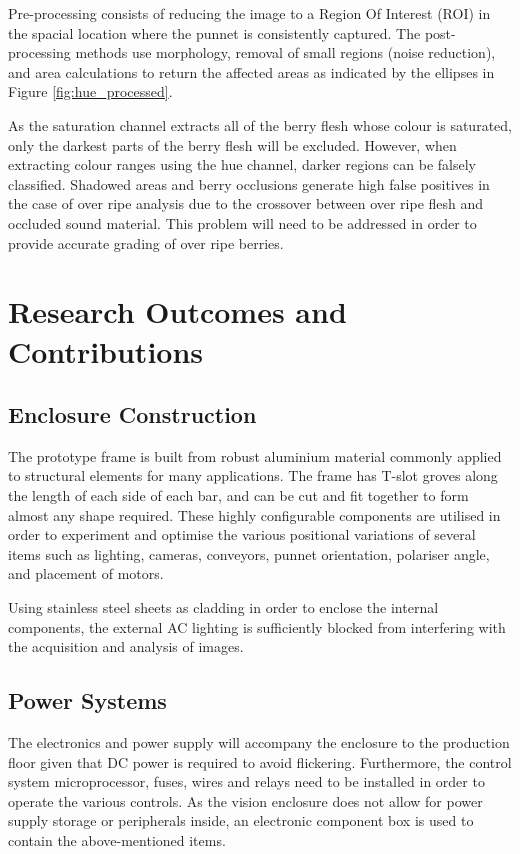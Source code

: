 \documentclass[fleqn,twoside,12pt]{report}
\begin{document}
Pre-processing consists of reducing the image to a Region Of Interest (ROI) in the spacial location where the punnet is consistently captured. The post-processing methods use morphology, removal of small regions (noise reduction), and area calculations to return the affected areas as indicated by the ellipses in Figure \ref{fig:hue_processed}.


As the saturation channel extracts all of the berry flesh whose colour is saturated, only the darkest parts of the berry flesh will be excluded. However, when extracting colour ranges using the hue channel, darker regions can be falsely classified. Shadowed areas and berry occlusions generate high false positives in the case of over ripe analysis due to the crossover between over ripe flesh and occluded sound material. This problem will need to be addressed in order to provide accurate grading of over ripe berries. 


\section{Research Outcomes and Contributions}


\subsection{Enclosure Construction}

The prototype frame is built from robust aluminium material commonly applied to structural elements for many applications. The frame has T-slot groves along the length of each side of each bar, and can be cut and fit together to form almost any shape required. These highly configurable components are utilised in order to experiment and optimise the various positional variations of several items such as lighting, cameras, conveyors, punnet orientation, polariser angle, and placement of motors. 

Using stainless steel sheets as cladding in order to enclose the internal components, the external AC lighting is sufficiently blocked from interfering with the acquisition and analysis of images.   



\subsection{Power Systems}
\label{sec:electronic_power}

The electronics and power supply will accompany the enclosure to the production floor given that DC power is required to avoid flickering. Furthermore, the control system microprocessor, fuses, wires and relays need to be installed in order to operate the various controls. As the vision enclosure does not allow for power supply storage or peripherals inside, an electronic component box is used to contain the above-mentioned items. 
\end{document}
